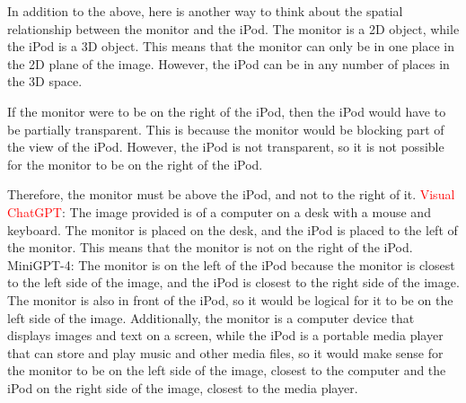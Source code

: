 \begin{enumerate}
    In addition to the above, here is another way to think about the spatial relationship between the monitor and the iPod. The monitor is a 2D object, while the iPod is a 3D object. This means that the monitor can only be in one place in the 2D plane of the image. However, the iPod can be in any number of places in the 3D space.

    If the monitor were to be on the right of the iPod, then the iPod would have to be partially transparent. This is because the monitor would be blocking part of the view of the iPod. However, the iPod is not transparent, so it is not possible for the monitor to be on the right of the iPod.

    Therefore, the monitor must be above the iPod, and not to the right of it.
    \subitem \textcolor{red}{Visual ChatGPT}: The image provided is of a computer on a desk with a mouse and keyboard. The monitor is placed on the desk, and the iPod is placed to the left of the monitor. This means that the monitor is not on the right of the iPod.
    \subitem MiniGPT-4: The monitor is on the left of the iPod because the monitor is closest to the left side of the image, and the iPod is closest to the right side of the image. The monitor is also in front of the iPod, so it would be logical for it to be on the left side of the image. Additionally, the monitor is a computer device that displays images and text on a screen, while the iPod is a portable media player that can store and play music and other media files, so it would make sense for the monitor to be on the left side of the image, closest to the computer and the iPod on the right side of the image, closest to the media player.
\end{enumerate}
